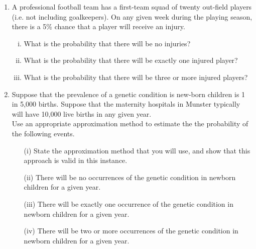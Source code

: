 \documentclass[a4paper,12pt]{article}
\begin{document}
\begin{enumerate}
\item A professional football team has a first-team squad of twenty out-field players (i.e. not including goalkeepers).
On any given week during the playing season, there is a 5\% chance that a player will receive an injury.
\begin{enumerate}[(i)]
\item What is the probability that there will be no injuries?
\item What is the probability that there will be exactly one injured player?
\item What is the probability that there will be three or more injured players?
\end{enumerate}
\item Suppose that the prevalence of a genetic condition is new-born children is 1 in 5,000 births. Suppose that the maternity hospitals in Munster typically will have 10,000 live births in any given year.\\ 
Use an appropriate approximation method to estimate the the probability of the following events.
\begin{itemize}
\item[(i)] State the approximation method that you will use, and show that this approach is valid in this instance.
\item [(ii)]There will be no occurrences of the genetic condition in newborn children for a given year.
\item [(iii)]There will be exactly one occurrence of the genetic condition in newborn children for a given year.
\item [(iv)]There will be two or more occurrences of the genetic condition in newborn children for a given year.
\end{itemize}
\end{enumerate}

\end{document}
